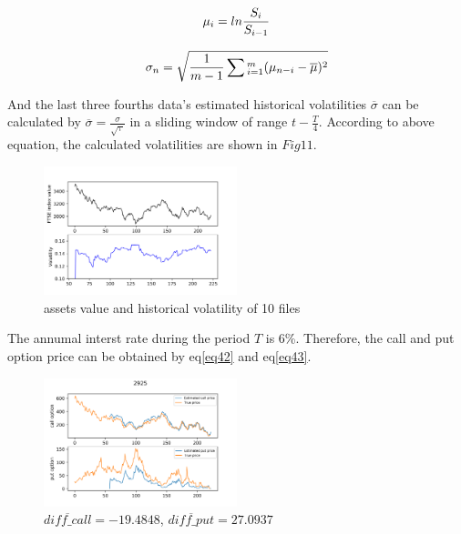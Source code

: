 \documentclass[sigconf]{acmart}
\begin{document}
\begin{equation} \label{eq44}
\setlength{\abovedisplayskip}{3pt}
\setlength{\belowdisplayskip}{9pt}
\mu_{i} = ln\frac{S_{i}}{S_{i-1}}
\end{equation}

\begin{equation} \label{eq45}
\setlength{\abovedisplayskip}{3pt}
\setlength{\belowdisplayskip}{9pt}
\sigma_{n} = \sqrt{\frac{1}{m-1}\sum{_{i=1}^{m}(\mu_{n-i}-\overline{\mu})^{2}}}
\end{equation}

And the last three fourths data's estimated historical volatilities $\overline{\sigma}$ can be calculated by $\overline{\sigma}=\frac{\sigma}{\sqrt{\uptau}}$ in a sliding window of range $t-\frac{T}{4}$. According to above equation, the calculated volatilities are shown in $Fig11$.

\begin{figure}[htbp]
    \centering
    \includegraphics[width=0.5\textwidth]{13.png}
    \caption{\label{}assets value and historical volatility of 10 files}
\end{figure}

The annumal interst rate during the period $T$ is 6\%. Therefore, the call and put option price can be obtained by eq\eqref{eq42} and eq\eqref{eq43}.

\begin{figure}[htbp]
    \centering
    \includegraphics[width=0.5\textwidth]{14.png}
    \caption{\label{}$\overline{diff\_call}=-19.4848$, $\overline{diff\_put}=27.0937$}
\end{figure}
\end{document}

